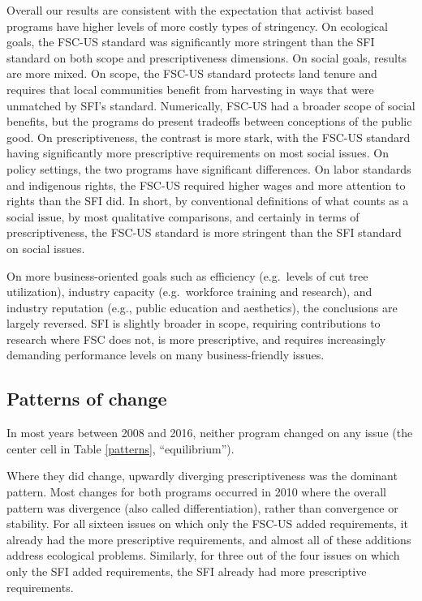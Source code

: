 \documentclass[
      12pt,
            Review ]{article}
\begin{document}
Overall our results are consistent with the expectation that activist
based programs have higher levels of more costly types of stringency. On
ecological goals, the FSC-US standard was significantly more stringent
than the SFI standard on both scope and prescriptiveness dimensions. On
social goals, results are more mixed. On scope, the FSC-US standard
protects land tenure and requires that local communities benefit from
harvesting in ways that were unmatched by SFI's standard. Numerically,
FSC-US had a broader scope of social benefits, but the programs do
present tradeoffs between conceptions of the public good. On
prescriptiveness, the contrast is more stark, with the FSC-US standard
having significantly more prescriptive requirements on most social
issues. On policy settings, the two programs have significant
differences. On labor standards and indigenous rights, the FSC-US
required higher wages and more attention to rights than the SFI did. In
short, by conventional definitions of what counts as a social issue, by
most qualitative comparisons, and certainly in terms of
prescriptiveness, the FSC-US standard is more stringent than the SFI
standard on social issues.

On more business-oriented goals such as efficiency (e.g.~levels of cut
tree utilization), industry capacity (e.g.~workforce training and
research), and industry reputation (e.g., public education and
aesthetics), the conclusions are largely reversed. SFI is slightly
broader in scope, requiring contributions to research where FSC does
not, is more prescriptive, and requires increasingly demanding
performance levels on many business-friendly issues.

\subsection{Patterns of change}\label{patterns-of-change}

In most years between 2008 and 2016, neither program changed on any
issue (the center cell in Table \ref{patterns}, ``equilibrium'').

Where they did change, upwardly diverging prescriptiveness was the
dominant pattern. Most changes for both programs occurred in 2010 where
the overall pattern was divergence (also called differentiation), rather
than convergence or stability. For all sixteen issues on which only the
FSC-US added requirements, it already had the more prescriptive
requirements, and almost all of these additions address ecological
problems. Similarly, for three out of the four issues on which only the
SFI added requirements, the SFI already had more prescriptive
requirements.
\end{document}
